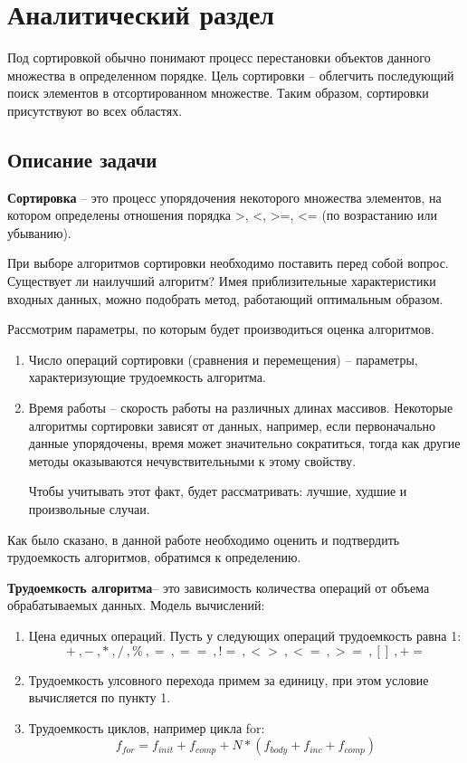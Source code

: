 \chapter{Аналитический раздел}
\label{cha:analysis}

        Под сортировкой обычно понимают процесс перестановки объектов данного множества в определенном порядке. Цель сортировки -- облегчить последующий поиск элементов в отсортированном множестве. Таким образом, сортировки присутствуют во всех областях. 
        
        \section{Описание задачи}
        
        \textbf{Сортировка} -- это процесс упорядочения некоторого множества элементов, на котором определены отношения порядка >, <, >=, <= (по возрастанию или убыванию).
        
        
        При выборе алгоритмов сортировки необходимо поставить перед собой вопрос. Существует ли наилучший алгоритм? Имея приблизительные характеристики входных данных, можно подобрать метод, работающий оптимальным образом.
        
        Рассмотрим параметры, по которым будет производиться оценка алгоритмов.
        \begin{enumerate}
	\item Число операций сортировки (сравнения и перемещения) -- параметры, характеризующие трудоемкость алгоритма.
	\item Время работы -- скорость работы на различных длинах массивов. Некоторые алгоритмы сортировки зависят от данных, например, если первоначально данные упорядочены, время может значительно сократиться, тогда как другие методы оказываются нечувствительными к этому свойству. 
	
	Чтобы учитывать этот факт, будет рассматривать: лучшие, худшие и произвольные случаи. 
	\end{enumerate}
	
	Как было сказано, в данной работе необходимо оценить и подтвердить трудоемкость алгоритмов, обратимся к определению. 
        
        \textbf{Трудоемкость алгоритма}-- это зависимость количества операций от объема обрабатываемых данных.
        Модель вычислений:
        \begin{enumerate}
		\item Цена едичных операций. Пусть у следующих операций трудоемкость равна 1:
		$$+~,-~,*~,/~,\%~,=~,==~,!=~,<>~,<=~,>=~,[]~,+=$$
		\item Трудоемкость улсовного перехода примем за единицу, при этом условие вычисляется по пункту 1. 
		\item Трудоемкость циклов, например цикла for:
		$$f_{for} = f_{init}+f_{comp}+N*(f_{body}+f_{inc}+f_{comp})$$
	\end{enumerate}

